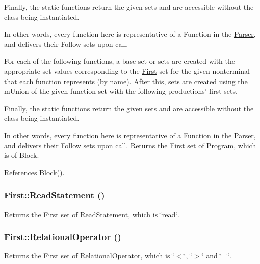 Finally, the static functions return the given sets and are accessible without the class being instantiated.

In other words, every function here is representative of a Function in the \hyperlink{classParser}{Parser}, and delivers their Follow sets upon call.

For each of the following functions, a base set or sets are created with the appropriate set values corresponding to the \hyperlink{classFirst}{First} set for the given nonterminal that each function represents (by name). After this, sets are created using the mUnion of the given function set with the following productions' first sets.

Finally, the static functions return the given sets and are accessible without the class being instantiated.

In other words, every function here is representative of a Function in the \hyperlink{classParser}{Parser}, and delivers their Follow sets upon call. Returns the \hyperlink{classFirst}{First} set of Program, which is of Block. 

References Block().

\hypertarget{classFirst_a88b0ba44671efe5d4838fa80cbc663fd}{
\subsubsection[{ReadStatement}]{ First::ReadStatement ()}}
\label{classFirst_a88b0ba44671efe5d4838fa80cbc663fd}


Returns the \hyperlink{classFirst}{First} set of ReadStatement, which is \char`\"{}read\char`\"{}. 

\hypertarget{classFirst_a261d760170710c35d83cf5d31d4d252c}{
\subsubsection[{RelationalOperator}]{ First::RelationalOperator ()}}
\label{classFirst_a261d760170710c35d83cf5d31d4d252c}


Returns the \hyperlink{classFirst}{First} set of RelationalOperator, which is \char`\"{}$<$\char`\"{}, \char`\"{}$>$\char`\"{} and \char`\"{}=\char`\"{}. 

